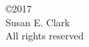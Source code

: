 \vspace*{7in}
\thispagestyle{empty}
\noindent
\setlength{\baselineskip}{0.625 \baselineskip}
\begin{center}
  \copyright 2017 \\
  \vspace{0.05in}
  Susan E. Clark \\
  All rights reserved
\end{center}
\setlength{\baselineskip}{1.6 \baselineskip}


\clearpage
